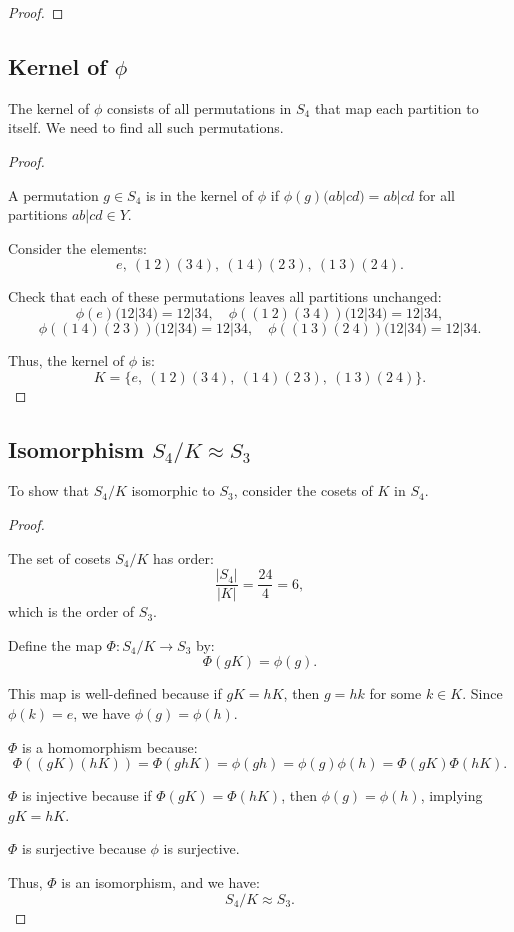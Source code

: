 \documentclass[12pt]{amsart}
\theoremstyle{definition}
\numberwithin{equation}{section}
\begin{document}
\begin{exercise}{4}
\begin{proof}
    \end{proof}

    \subsection*{Kernel of \(\phi\)}

    The kernel of \(\phi\) consists of all permutations in \(S_4\) that map each partition to itself. We need to find all such permutations.

    \begin{proof} \( \)

    A permutation \(g \in S_4\) is in the kernel of \(\phi\) if \(\phi(g)(ab|cd) = ab|cd\) for all partitions \(ab|cd \in Y\).

    Consider the elements:
    \[
    e, \ (1 \ 2)(3 \ 4), \ (1 \ 4)(2 \ 3), \ (1 \ 3)(2 \ 4).
    \]

    Check that each of these permutations leaves all partitions unchanged:
    \[
    \phi(e)(12|34) = 12|34, \quad \phi((1 \ 2)(3 \ 4))(12|34) = 12|34,
    \]
    \[
    \phi((1 \ 4)(2 \ 3))(12|34) = 12|34, \quad \phi((1 \ 3)(2 \ 4))(12|34) = 12|34.
    \]

    Thus, the kernel of \(\phi\) is:
    \[
    K = \{e, \ (1 \ 2)(3 \ 4), \ (1 \ 4)(2 \ 3), \ (1 \ 3)(2 \ 4)\}.
    \]

    \end{proof}

    \subsection*{Isomorphism \(S_4 / K \approx S_3\)}

    To show that \(S_4 / K\) isomorphic to \(S_3\), consider the cosets of \(K\) in \(S_4\).

    \begin{proof} \( \)

    The set of cosets \(S_4 / K\) has order:
    \[
    \frac{|S_4|}{|K|} = \frac{24}{4} = 6,
    \]
    which is the order of \(S_3\).

    Define the map \(\Phi: S_4 / K \rightarrow S_3\) by:
    \[
    \Phi(gK) = \phi(g).
    \]

    This map is well-defined because if \(gK = hK\), then \(g = hk\) for some \(k \in K\). Since \(\phi(k) = e\), we have \(\phi(g) = \phi(h)\).

    \(\Phi\) is a homomorphism because:
    \[
    \Phi((gK)(hK)) = \Phi(ghK) = \phi(gh) = \phi(g)\phi(h) = \Phi(gK)\Phi(hK).
    \]

    \(\Phi\) is injective because if \(\Phi(gK) = \Phi(hK)\), then \(\phi(g) = \phi(h)\), implying \(gK = hK\).

    \(\Phi\) is surjective because \(\phi\) is surjective.

    Thus, \(\Phi\) is an isomorphism, and we have:
    \[
    S_4 / K \approx S_3.
    \]

    \end{proof}

\end{exercise}
\newpage
\end{document}
